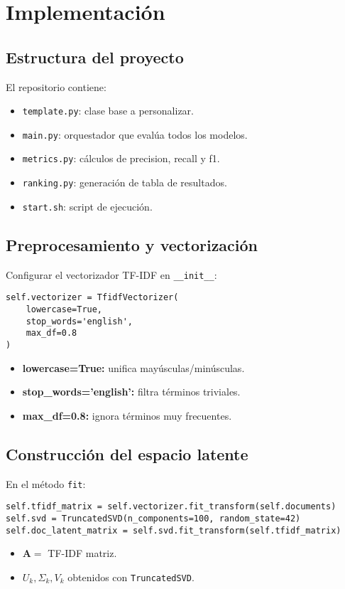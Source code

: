 \documentclass[12pt,a4paper]{report}
\begin{document}
\chapter{Implementación}
\section{Estructura del proyecto}
El repositorio contiene:
\begin{itemize}
  \item \texttt{template.py}: clase base a personalizar.
  \item \texttt{main.py}: orquestador que evalúa todos los modelos.
  \item \texttt{metrics.py}: cálculos de precision, recall y f1.
  \item \texttt{ranking.py}: generación de tabla de resultados.
  \item \texttt{start.sh}: script de ejecución.
\end{itemize}

\section{Preprocesamiento y vectorización}
Configurar el vectorizador TF-IDF en \texttt{\_\_init\_\_}:
\begin{verbatim}
self.vectorizer = TfidfVectorizer(
    lowercase=True,
    stop_words='english',
    max_df=0.8
)
\end{verbatim}
\begin{itemize}
  \item \textbf{lowercase=True:} unifica mayúsculas/minúsculas.
  \item \textbf{stop\_words='english':} filtra términos triviales.
  \item \textbf{max\_df=0.8:} ignora términos muy frecuentes.
\end{itemize}

\section{Construcción del espacio latente}
En el método \texttt{fit}:
\begin{verbatim}
self.tfidf_matrix = self.vectorizer.fit_transform(self.documents)
self.svd = TruncatedSVD(n_components=100, random_state=42)
self.doc_latent_matrix = self.svd.fit_transform(self.tfidf_matrix)
\end{verbatim}
\begin{itemize}
  \item \(\mathbf{A} =\) TF-IDF matriz.
  \item \(U_k,\Sigma_k,V_k\) obtenidos con \texttt{TruncatedSVD}.
\end{itemize}
\end{document}
